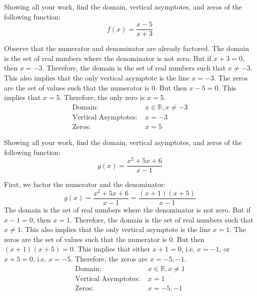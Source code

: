 \documentclass[11pt,letterpaper]{article}
\begin{document}

 Showing all your work, find the domain, vertical asymptotes, and zeros of the following function:
	\[
	f(x)= \dfrac{x - 5}{x + 3}
	\] \pspace

\sol Observe that the numerator and denominator are already factored. The domain is the set of real numbers where the denominator is not zero. But if $x + 3= 0$, then $x= -3$. Therefore, the domain is the set of real numbers such that $x \neq -3$. This also implies that the only vertical asymptote is the line $x= -3$. The zeros are the set of values such that the numerator is 0. But then $x - 5= 0$. This implies that $x= 5$. Therefore, the only zero is $x= 5$. 
	\[
	\boxed{
	\begin{aligned}
	\text{Domain: }& x \in \mathbb{R}, x \neq -3 \\
	\text{Vertical Asymptotes: }& x= -3 \\
	\text{Zeros: }& x= 5
	\end{aligned}
	}
	\]





\newpage





 Showing all your work, find the domain, vertical asymptotes, and zeros of the following function:
	\[
	g(x)= \dfrac{x^2 + 5x + 6}{x - 1}
	\] \pspace

\sol First, we factor the numerator and the denominator:
	\[
	g(x)= \dfrac{x^2 + 5x + 6}{x - 1}= \dfrac{(x + 1)(x + 5)}{x - 1}
	\]
The domain is the set of real numbers where the denominator is not zero. But if $x - 1= 0$, then $x= 1$. Therefore, the domain is the set of real numbers such that $x \neq 1$. This also implies that the only vertical asymptote is the line $x= 1$. The zeros are the set of values such that the numerator is 0. But then $(x + 1)(x + 5)= 0$. This implies that either $x + 1= 0$, i.e. $x= -1$, or $x + 5= 0$, i.e. $x= -5$. Therefore, the zeros are $x= -5, -1$. 
	\[
	\boxed{
	\begin{aligned}
	\text{Domain: }& x \in \mathbb{R}, x \neq 1 \\
	\text{Vertical Asymptotes: }& x= 1 \\
	\text{Zeros: }& x= -5, -1
	\end{aligned}
	}
	\]
\end{document}
